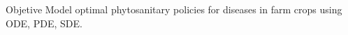	\begin{frame}{}
		\begin{block}{Objetive}
			Model \textcolor{greenstrong}{optimal phytosanitary policies} for diseases in farm crops using ODE, PDE, SDE.
		\end{block}
	\end{frame}
